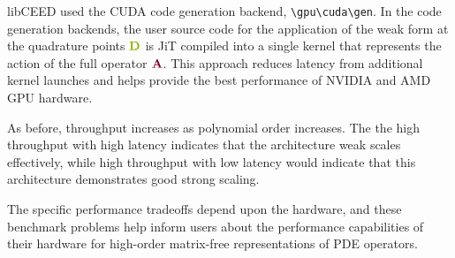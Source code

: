 libCEED used the CUDA code generation backend, \lstinline{\gpu\cuda\gen}.
In the code generation backends, the user source code for the application of the weak form at the quadrature points ${\color{applegreen}\mathbf{D}}$ is JiT compiled into a single kernel that represents the action of the full operator ${\color{burgundy}\mathbf{A}}$.
This approach reduces latency from additional kernel launches and helps provide the best performance of NVIDIA and AMD GPU hardware.

As before, throughput increases as polynomial order increases.
The the high throughput with high latency indicates that the architecture weak scales effectively, while high throughput with low latency would indicate that this architecture demonstrates good strong scaling.

The specific performance tradeoffs depend upon the hardware, and these benchmark problems help inform users about the performance capabilities of their hardware for high-order matrix-free representations of PDE operators.
